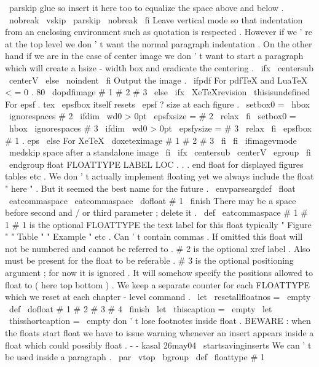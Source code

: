 {{{{{%
\
parskip
glue
so
insert
it
here
too
to
equalize
the
space
%
above
and
below
.
\
nobreak
\
vskip
\
parskip
\
nobreak
\
fi
%
%
Leave
vertical
mode
so
that
indentation
from
an
enclosing
%
environment
such
as
quotation
is
respected
.
%
However
if
we
'
re
at
the
top
level
we
don
'
t
want
the
%
normal
paragraph
indentation
.
%
On
the
other
hand
if
we
are
in
the
case
of
center
image
we
don
'
t
%
want
to
start
a
paragraph
which
will
create
a
hsize
-
width
box
and
%
eradicate
the
centering
.
\
ifx
\
centersub
\
centerV
\
else
\
noindent
\
fi
%
%
Output
the
image
.
\
ifpdf
%
For
pdfTeX
and
LuaTeX
<
=
0
.
80
\
dopdfimage
{
#
1
}
{
#
2
}
{
#
3
}
%
\
else
\
ifx
\
XeTeXrevision
\
thisisundefined
%
For
epsf
.
tex
%
\
epsfbox
itself
resets
\
epsf
?
size
at
each
figure
.
\
setbox0
=
\
hbox
{
\
ignorespaces
#
2
}
%
\
ifdim
\
wd0
>
0pt
\
epsfxsize
=
#
2
\
relax
\
fi
\
setbox0
=
\
hbox
{
\
ignorespaces
#
3
}
%
\
ifdim
\
wd0
>
0pt
\
epsfysize
=
#
3
\
relax
\
fi
\
epsfbox
{
#
1
.
eps
}
%
\
else
%
For
XeTeX
\
doxeteximage
{
#
1
}
{
#
2
}
{
#
3
}
%
\
fi
\
fi
%
\
ifimagevmode
\
medskip
%
space
after
a
standalone
image
\
fi
\
ifx
\
centersub
\
centerV
\
egroup
\
fi
\
endgroup
}
%
float
FLOATTYPE
LABEL
LOC
.
.
.
end
float
for
displayed
figures
tables
%
etc
.
We
don
'
t
actually
implement
floating
yet
we
always
include
the
%
float
"
here
"
.
But
it
seemed
the
best
name
for
the
future
.
%
\
envparseargdef
\
float
{
\
eatcommaspace
\
eatcommaspace
\
dofloat
#
1
\
finish
}
%
There
may
be
a
space
before
second
and
/
or
third
parameter
;
delete
it
.
\
def
\
eatcommaspace
#
1
{
#
1
}
%
#
1
is
the
optional
FLOATTYPE
the
text
label
for
this
float
typically
%
"
Figure
"
"
Table
"
"
Example
"
etc
.
Can
'
t
contain
commas
.
If
omitted
%
this
float
will
not
be
numbered
and
cannot
be
referred
to
.
%
%
#
2
is
the
optional
xref
label
.
Also
must
be
present
for
the
float
to
%
be
referable
.
%
%
#
3
is
the
optional
positioning
argument
;
for
now
it
is
ignored
.
It
%
will
somehow
specify
the
positions
allowed
to
float
to
(
here
top
bottom
)
.
%
%
We
keep
a
separate
counter
for
each
FLOATTYPE
which
we
reset
at
each
%
chapter
-
level
command
.
\
let
\
resetallfloatnos
=
\
empty
%
\
def
\
dofloat
#
1
#
2
#
3
#
4
\
finish
{
%
\
let
\
thiscaption
=
\
empty
\
let
\
thisshortcaption
=
\
empty
%
%
don
'
t
lose
footnotes
inside
float
.
%
%
BEWARE
:
when
the
floats
start
float
we
have
to
issue
warning
whenever
an
%
insert
appears
inside
a
float
which
could
possibly
float
.
-
-
kasal
26may04
%
\
startsavinginserts
%
%
We
can
'
t
be
used
inside
a
paragraph
.
\
par
%
\
vtop
\
bgroup
\
def
\
floattype
{
#
1
}
}}}}}
